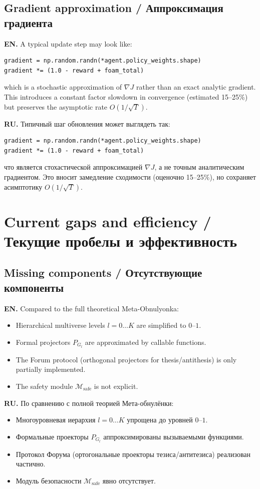 \documentclass[11pt,a4paper]{article}
\begin{document}
\subsection{Gradient approximation / Аппроксимация градиента}

\textbf{EN.}
A typical update step may look like:
\begin{verbatim}
gradient = np.random.randn(*agent.policy_weights.shape)
gradient *= (1.0 - reward + foam_total)
\end{verbatim}
which is a stochastic approximation of $\nabla J$ rather than an exact analytic gradient.
This introduces a constant factor slowdown in convergence (estimated 15--25\%) but preserves the asymptotic rate $O(1/\sqrt{T})$.

\textbf{RU.}
Типичный шаг обновления может выглядеть так:
\begin{verbatim}
gradient = np.random.randn(*agent.policy_weights.shape)
gradient *= (1.0 - reward + foam_total)
\end{verbatim}
что является стохастической аппроксимацией $\nabla J$, а не точным аналитическим градиентом.
Это вносит замедление сходимости (оценочно 15--25\%), но сохраняет асимптотику $O(1/\sqrt{T})$.

\section{Current gaps and efficiency / Текущие пробелы и эффективность}

\subsection{Missing components / Отсутствующие компоненты}

\textbf{EN.}
Compared to the full theoretical Meta-Obnulyonka:
\begin{itemize}
\item Hierarchical multiverse levels $l=0\ldots K$ are simplified to $0$--$1$.
\item Formal projectors $P_{G_l}$ are approximated by callable functions.
\item The Forum protocol (orthogonal projectors for thesis/antithesis) is only partially implemented.
\item The safety module $\mathcal{M}_{\text{safe}}$ is not explicit.
\end{itemize}

\textbf{RU.}
По сравнению с полной теорией Мета-обнулёнки:
\begin{itemize}
\item Многоуровневая иерархия $l=0\ldots K$ упрощена до уровней $0$--$1$.
\item Формальные проекторы $P_{G_l}$ аппроксимированы вызываемыми функциями.
\item Протокол Форума (ортогональные проекторы тезиса/антитезиса) реализован частично.
\item Модуль безопасности $\mathcal{M}_{\text{safe}}$ явно отсутствует.
\end{itemize}
\end{document}
